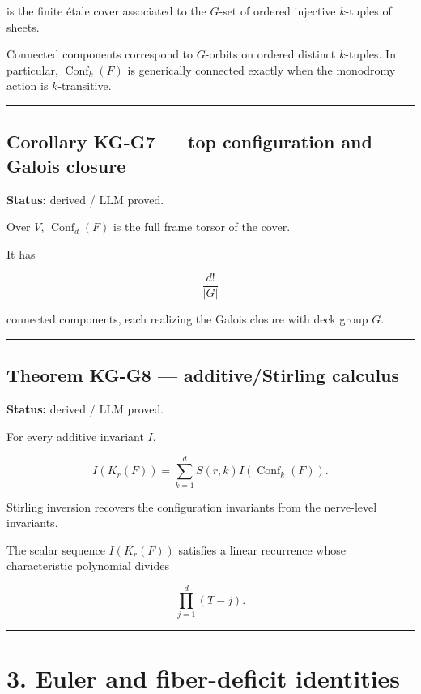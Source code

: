 is the finite étale cover associated to the \(G\)-set of ordered
injective \(k\)-tuples of sheets.

Connected components correspond to \(G\)-orbits on ordered distinct
\(k\)-tuples. In particular, \(\operatorname{Conf}_k(F)\) is generically
connected exactly when the monodromy action is \(k\)-transitive.

\begin{center}\rule{0.5\linewidth}{0.5pt}\end{center}

\subsection{Corollary KG-G7 --- top configuration and Galois
closure}\label{corollary-kg-g7-top-configuration-and-galois-closure}

\textbf{Status:} derived / LLM proved.

Over \(V\), \(\operatorname{Conf}_d(F)\) is the full frame torsor of the
cover.

It has

\[
\frac{d!}{|G|}
\]

connected components, each realizing the Galois closure with deck group
\(G\).

\begin{center}\rule{0.5\linewidth}{0.5pt}\end{center}

\subsection{Theorem KG-G8 --- additive/Stirling
calculus}\label{theorem-kg-g8-additivestirling-calculus}

\textbf{Status:} derived / LLM proved.

For every additive invariant \(I\),

\[
I(K_r(F))
=
\sum_{k=1}^d S(r,k) I(\operatorname{Conf}_k(F)).
\]

Stirling inversion recovers the configuration invariants from the
nerve-level invariants.

The scalar sequence \(I(K_r(F))\) satisfies a linear recurrence whose
characteristic polynomial divides

\[
\prod_{j=1}^d(T-j).
\]

\begin{center}\rule{0.5\linewidth}{0.5pt}\end{center}

\section{3. Euler and fiber-deficit
identities}\label{euler-and-fiber-deficit-identities}

